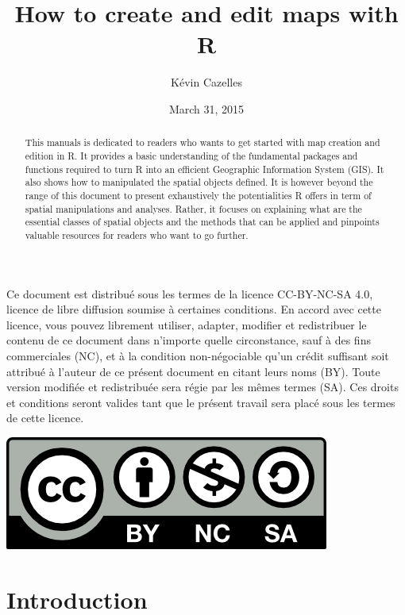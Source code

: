 \documentclass[]{report}
\title{How to create and edit maps with R}
\author{Kévin Cazelles}
\date{March 31, 2015}
\begin{document}
\maketitle
\begin{abstract}
This manuals is dedicated to readers who wants to get started with map
creation and edition in R. It provides a basic understanding of the
fundamental packages and functions required to turn R into an efficient
Geographic Information System (GIS). It also shows how to manipulated
the spatial objects defined. It is however beyond the range of this
document to present exhaustively the potentialities R offers in term of
spatial manipulations and analyses. Rather, it focuses on explaining
what are the essential classes of spatial objects and the methods that
can be applied and pinpoints valuable resources for readers who want to
go further.
\end{abstract}


Ce document est distribu\'{e} sous les termes de la licence CC-BY-NC-SA 4.0, licence de libre diffusion soumise à certaines conditions. En accord avec cette licence, vous pouvez librement utiliser, adapter, modifier et redistribuer le contenu de ce document dans n'importe quelle circonstance, sauf à des fins commerciales (NC), et à la condition non-n\'{e}gociable qu’un cr\'{e}dit suffisant soit attribu\'{e} à l'auteur de ce pr\'{e}sent document en citant leurs noms (BY). Toute version modifi\'{e}e et redistribu\'{e}e sera r\'{e}gie par les m\^{e}mes termes (SA). Ces droits et conditions seront valides tant que le pr\'{e}sent travail sera plac\'{e} sous les termes de cette licence.

\begin{center}
\includegraphics[width=.28\textwidth]{aux/ccbyncsa.png}
\end{center}


\newpage

{
\setcounter{tocdepth}{2}
\tableofcontents
}
\listoffigures
\hypertarget{introduction}{%
\chapter{Introduction}\label{introduction}}
\end{document}
